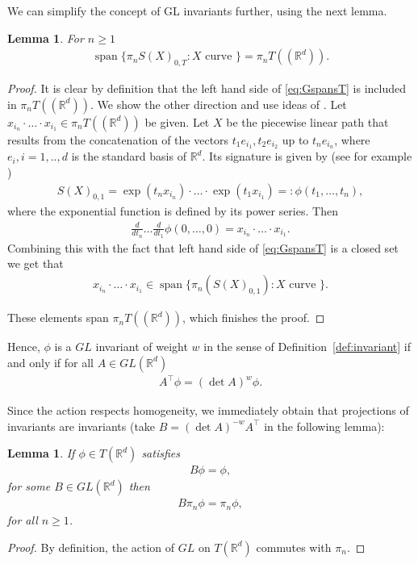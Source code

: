 \documentclass{scrartcl}
\theoremstyle{plain}
\newtheorem{lemma}[theorem]{Lemma}
\theoremstyle{definition}
\newcommand{\R}{\mathbb{R}}
\newcommand{\1}[1]{1_{\{#1\}}}
\newcommand{\spann}{\operatorname{span}}
\newcommand{\ds}{d} %
\newcommand{\TC}{T((\R^\ds))} %
\newcommand{\TS}{T(\R^\ds)} %
\begin{document}
We can simplify the concept of GL invariants further, using the next lemma.
\begin{lemma}
  \label{lem:spans}
  For $n\ge 1$
  \begin{align}
    \label{eq:GspansT}
    \operatorname{span} \{ \pi_n S(X)_{0,T} : X \text{ curve } \} = \pi_n \TC.
  \end{align}
\end{lemma}
\begin{proof}
  It is clear by definition that the left hand side of \eqref{eq:GspansT} is included in $\pi_n \TC$.
  We show the other direction and use ideas of \cite[Proposition 4]{bib:CF2010}. 
  Let $x_{i_n} \cdot \ldots \cdot x_{i_1} \in \pi_n \TC$ be given.
  Let $X$ be the piecewise linear path that results from the concatenation of the vectors $t_1 e_{i_1}, t_2 e_{i_2}$ up to $t_n e_{i_n}$,
  where $e_i, i=1,..,\ds$ is the standard basis of $\R^\ds$.
  Its signature is given by (see for example \cite[Chapter 6]{bib:FV2010})
  \begin{align*}
    S(X)_{0,1} = \exp( {t_n x_{i_n}} ) \cdot \ldots \cdot \exp( t_1 x_{i_1} ) =: \phi(t_1, \dots, t_n),
  \end{align*}
  where the exponential function is defined by its power series.
  Then
  \begin{align*}
    \frac{d}{dt_n} \dots \frac{d}{dt_1} \phi(0,\dots,0) = x_{i_n} \cdot \ldots \cdot x_{i_1}.
  \end{align*}
  Combining this with the fact that left hand side of \eqref{eq:GspansT} is a closed set we get that
  \begin{align*}
    x_{i_n} \cdot \ldots \cdot x_{i_1}
    \in 
    \spann\{ \pi_n( S(X) _{0,1} ) : X \text{ curve } \}.
  \end{align*}

  These elements span $\pi_n \TC$, which finishes the proof.
\end{proof}

Hence, $\phi$ is a $GL$ invariant of weight $w$ in the sense of Definition~\ref{def:invariant} if and only if
for all $A \in GL(\R^\ds)$
\begin{align*}
  A^\top \phi  = (\det A)^w \phi.
\end{align*}


Since the action respects homogeneity, we immediately obtain
that projections of invariants are invariants (take $B = (\det A)^{-w} A^\top$ in the following lemma):
\begin{lemma}
  \label{lem:projectionIsInvariant}
  If $\phi \in \TS$ satisfies
  \begin{align*}
    B \phi = \phi,
  \end{align*}
  for some $B \in GL(\R^\ds)$ then
  \begin{align*}
    B \pi_n \phi = \pi_n \phi,
  \end{align*}
  for all $n \ge 1$.
\end{lemma}
\begin{proof}
  By definition,
  the action of $GL$ on $\TS$ commutes with $\pi_n$.
\end{proof}
\end{document}
